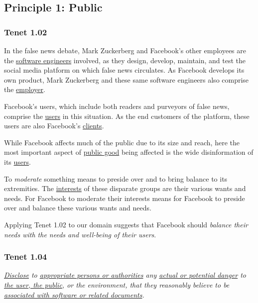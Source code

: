 

\subsection{Principle 1: Public}


\subsubsection{Tenet 1.02}

\tenetmargin

\par In the false news debate, Mark Zuckerberg and Facebook's other employees are the \ul{software engineers} involved, as they design, develop, maintain, and test the social media platform on which false news circulates. As Facebook develops its own product, Mark Zuckerberg and these same software engineers also comprise the \ul{employer}. 

\par Facebook's users, which include both readers and purveyors of false news, comprise the \ul{users} in this situation. As the end customers of the platform, these users are also Facebook's \ul{clients}.

\par While Facebook affects much of the public due to its size and reach, here the most important aspect of \ul{public good} being affected is the wide disinformation of its \ul{users}.

\par To \emph{moderate} something means to preside over and to bring balance to its extremities. \cite{dictionary} The \ul{interests} of these disparate groups are their various wants and needs. For Facebook to moderate their interests means for Facebook to preside over and balance these various wants and needs. 


Applying Tenet 1.02 to our domain suggests that Facebook should \emph{balance their needs with the needs and well-being of their users}.

\subsubsection{Tenet 1.04}
\emph{\ul{Disclose} to \ul{appropriate persons or authorities} any \ul{actual or potential danger} to \ul{the user, the public}, or the environment, that they reasonably believe to be \ul{associated with software or related documents}. \cite{se_code}}

